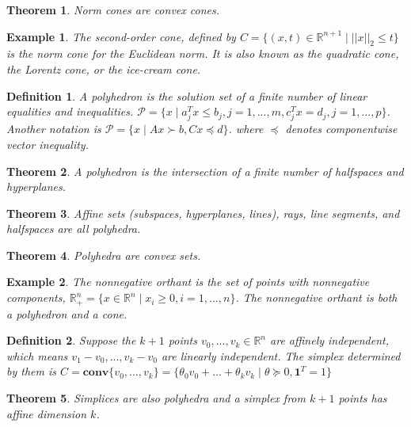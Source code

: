 \documentclass[a4paper]{article}
\newtheorem{mytheorem}{Theorem}
\newtheorem{example}{Example}
\newtheorem{mydef}{Definition}
\numberwithin{mytheorem}{section}
\numberwithin{mydef}{section}
\numberwithin{example}{section}
\begin{document}
\begin{mytheorem} Norm cones are convex cones.  \end{mytheorem}

\begin{example} The second-order cone, defined by $C = \{ (x,t) \in \mathbb{R}^{n+1} \mid ||x||_{2} \leq t \}$ is the norm cone for the Euclidean norm. It is also known as the quadratic cone, the Lorentz cone, or the ice-cream cone.
\end{example}

\begin{mydef} A polyhedron is the solution set of a finite number of linear equalities and inequalities. $\mathcal{P} = \{ x \mid a^{T}_{j}x \leq b_{j}, j = 1,...,m, c^{T}_{j}x = d_{j}, j = 1,...,p \} $. Another notation is $\mathcal{P} = \{ x \mid Ax \succ b, Cx \preceq d\}$. where $\preceq$ denotes componentwise vector inequality.  \end{mydef}

\begin{mytheorem} A polyhedron is the intersection of a finite number of halfspaces and hyperplanes.  \end{mytheorem}

\begin{mytheorem} Affine sets (subspaces, hyperplanes, lines), rays, line segments, and halfspaces are all polyhedra. \end{mytheorem}

\begin{mytheorem} Polyhedra are convex sets. \end{mytheorem}

\begin{example} The nonnegative orthant is the set of points with nonnegative components, $\mathbb{R}^{n}_{+} = \{ x \in \mathbb{R}^{n} \mid x_{i} \geq 0, i = 1,...,n \}$. The nonnegative orthant is both a polyhedron and a cone. 
\end{example}

\begin{mydef} Suppose the $k+1$ points $v_{0},...,v_{k} \in \mathbb{R}^{n}$ are affinely independent, which means $v_{1}-v_{0},...,v_{k}-v_{0}$ are linearly independent. The simplex determined by them is $C = \textbf{conv}\{ v_{0},...,v_{k}\} = \{ \theta_{0}v_{0} + ... + \theta_{k}v_{k} \mid \theta \succeq 0, \textbf{1}^{T} = 1 \} $ \end{mydef}

\begin{mytheorem} Simplices are also polyhedra and a simplex from $k+1$ points has affine dimension $k$. \end{mytheorem}
\end{document}
